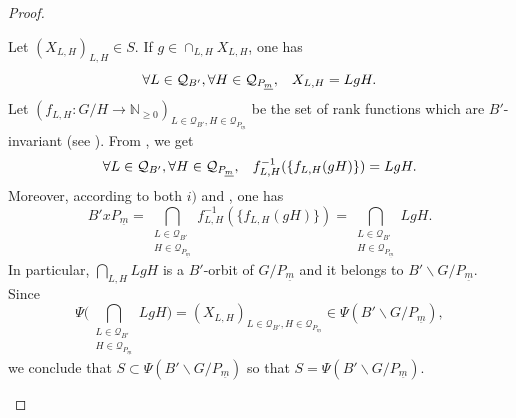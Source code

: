 \documentclass[pdftex]{sigma}
\numberwithin{equation}{section}
\theoremstyle{definition}
\newtheorem{Remark}[Theorem]{Remark}
\newcommand{\N}{\mathbb{N}}
\theoremstyle{plain}
\theoremstyle{plain}
\theoremstyle{plain}
\theoremstyle{plain}
\begin{document}
\begin{proof}
\begin{enumerate}[label = $\roman*)$]
		Let $(X_{L,H})_{L,H} \in S$. If $g \in \cap_{L,H} X_{L,H}$, one has
		\begin{equation*}
			\forall L \in \mathcal Q_{B'}, \forall H \in \mathcal Q_{P_{\underline m}}, \hspace{3mm} X_{L,H} = LgH.
		\end{equation*}
		Let $(f_{L,H}: G/H \to \N_{\geqslant 0})_{L \in \mathcal Q_{B'},H \in \mathcal Q_{P_{\underline m}}}$ be the set of rank functions which are $B'$-invariant (see ). From , we get
		\begin{equation*}
			\forall L \in \mathcal Q_{B'}, \forall H \in \mathcal Q_{P_{\underline m}}, \hspace{3mm} f_{L,H}^{-1}(\{f_{L,H}(gH)\}) = LgH.
		\end{equation*}
		Moreover, according to both $i)$ and , one has
		\begin{equation*}
			B'xP_{\underline m} = \bigcap_{\substack{L \in \mathcal Q_{B'} \\ H \in \mathcal Q_{P_{\underline m}}}} f_{L,H}^{-1}(\{f_{L,H}(gH)\}) = \bigcap_{\substack{L \in \mathcal Q_{B'} \\ H \in \mathcal Q_{P_{\underline m}}}} LgH.
		\end{equation*}
		In particular, $\bigcap_{L,H} LgH$ is a $B'$-orbit of $G/P_{\underline m}$ and it belongs to $B'\backslash G/P_{\underline m}$.
		Since 
		\begin{equation*}
			\Psi\Big(\bigcap_{\substack{L \in \mathcal Q_{B'} \\ H \in \mathcal Q_{P_{\underline m}}}} LgH\Big) = (X_{L,H})_{L \in \mathcal Q_{B'},H \in \mathcal Q_{P_{\underline m}}} \in \Psi(B'\backslash G/ P_{\underline m}),
		\end{equation*}
		we conclude that $S \subset \Psi(B'\backslash G/ P_{\underline m})$ so that $S = \Psi(B'\backslash G/ P_{\underline m})$.
	\end{enumerate}

\end{proof}

\end{document}
